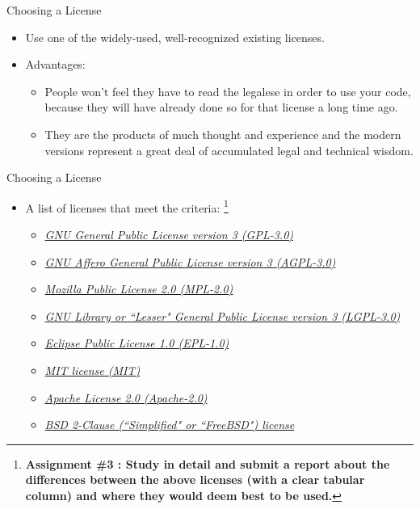 \documentclass{beamer}
\begin{document}
\begin{frame}{Choosing a License}
\begin{itemize}
	\item Use one of the widely-used, well-recognized existing licenses. 
	\item Advantages:
	\begin{itemize}
		\item People won't feel they have to read the legalese in order to use your code, because they will have already done so for that license a long time ago. 
		\item They are the products of much thought and experience and the modern versions represent a great deal of accumulated legal and technical wisdom.
	\end{itemize}
\end{itemize}
\end{frame}

\begin{frame}{Choosing a License}
\begin{itemize}
	\item A list of licenses that meet the criteria: \footnote{\textbf{\tiny{Assignment \#3 : Study in detail and submit a report about the differences between the above licenses (with a clear tabular column) and where they would deem best to be used.}}}
	\begin{itemize}
		\item \emph{\href{http://www.gnu.org/licenses/gpl.html}{\alert{GNU General Public License version 3 (GPL-3.0)}}}
		\item \emph{\href{http://www.gnu.org/licenses/agpl.html}{\alert{GNU Affero General Public License version 3 (AGPL-3.0)}}}
		\item \emph{\href{https://www.mozilla.org/MPL/}{Mozilla Public License 2.0 (MPL-2.0)}}
		\item \emph{\href{http://www.gnu.org/licenses/lgpl.html}{GNU Library or ``Lesser" General Public License version 3 (LGPL-3.0)}}
		\item \emph{\href{https://www.eclipse.org/legal/epl-v10.html}{Eclipse Public License 1.0 (EPL-1.0)}}
		\item \emph{\href{http://opensource.org/licenses/MIT}{\alert{MIT license (MIT)}}}
		\item \emph{\href{http://apache.org/licenses/LICENSE-2.0}{Apache License 2.0 (Apache-2.0)}}
		\item \emph{\href{http://opensource.org/licenses/BSD-2-Clause}{BSD 2-Clause (``Simplified" or ``FreeBSD") license}}	
	\end{itemize}
\end{itemize}
\end{frame}
	
\end{document}
